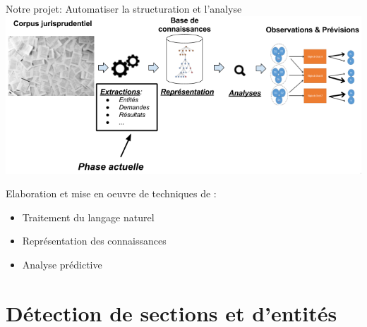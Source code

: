 \documentclass[newPxFont,pagenumber]{beamer}
\begin{document}
\begin{frame}{Notre projet: Automatiser la structuration et l'analyse}
\includegraphics[width=\textwidth]{pipeline-cassandra2.png}

Elaboration et mise en oeuvre de techniques de :
\begin{itemize}
\item Traitement du langage naturel 

\item Représentation des connaissances
 
\item Analyse prédictive
\end{itemize}

\end{frame}



\section{Détection de sections et d'entités}
\end{document}
